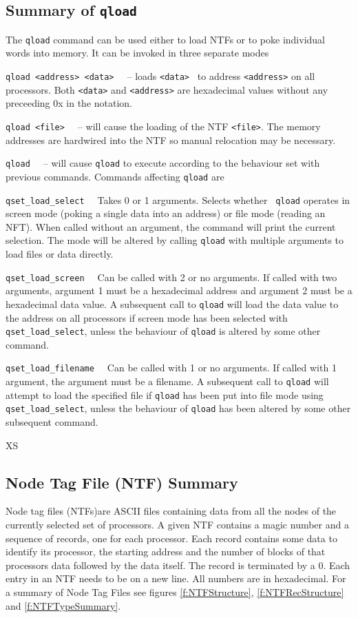 \subsection{Summary of {\tt qload}}
The {\tt qload} command can be used either to load NTFs or to poke
individual words into memory. It can be invoked in three separate modes
\begin{description}
\item{\tt qload <address> <data> \ } -- loads {\tt <data> } to address
{\tt <address>} on all processors. Both {\tt <data>} and {\tt <address>} 
are hexadecimal values without any preceeding 0x in the notation.
\item{\tt qload <file> \ } -- will cause the loading of the NTF {\tt <file>}.
The memory addresses are hardwired into the NTF so manual relocation may 
be necessary.
\item{\tt qload \ } -- will cause {\tt qload} to execute according to the 
behaviour set with previous commands. Commands affecting {\tt qload} are
\begin{description}
\item{\tt qset\_load\_select \ } Takes 0 or 1  arguments. Selects whether {\tt
qload} operates in screen mode (poking a single data into an address)
or file mode (reading an NFT). When called without an argument, the 
command will print the current selection. The mode will be altered by 
calling {\tt qload} with multiple arguments to load files or data directly.
\item{\tt qset\_load\_screen \ } Can be called with 2 or no arguments.
If called with two arguments, argument 1 must be a hexadecimal address
and argument 2 must be a hexadecimal data value. A subsequent call to 
{\tt qload} will load the data value to the address on all processors if
screen mode has been selected with {\tt qset\_load\_select}, unless
the behaviour of {\tt qload} is altered by some other command.
\item{\tt qset\_load\_filename \ } Can be called with 1 or no arguments.
If called with 1 argument, the argument must be a filename. A subsequent
call to {\tt qload} will attempt to load the specified file if {\tt qload}
has been put into file mode using {\tt qset\_load\_select}, unless the 
behaviour of {\tt qload} has been altered by some other subsequent command.
\end{description}
\end{description}
XS
\subsection{Node Tag File (NTF) Summary}
Node tag files (NTFs)are ASCII files containing data from all the nodes of the
currently selected set of processors. A given NTF contains a magic number
and a sequence of records, one for each processor. Each record contains
some data to identify its processor, the starting address and the number
of blocks of that processors data followed by the data itself. The record
is terminated by a 0. Each entry in an NTF needs to be on a new line.
All numbers are in hexadecimal. For a summary of Node Tag Files see
figures \ref{f:NTFStructure}, \ref{f:NTFRecStructure} and \ref{f:NTFTypeSummary}.

